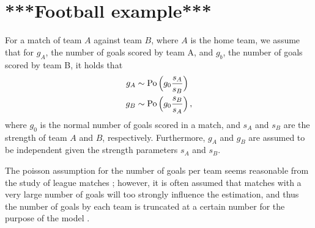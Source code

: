 \section{***Football example***}

For a match of team $A$ against team $B$, where $A$ is the home team,
we assume that for $g_A$, the number of goals scored by team A,
and $g_b$, the number of goals scored by team B, it holds that
\begin{align*}
g_A &\sim \operatorname{Po}\Big(g_0 \frac{s_A}{s_B}\Big) \\
g_B &\sim \operatorname{Po}\Big(g_0 \frac{s_B}{s_A}\Big) \,,
\end{align*}
where $g_0$ is the normal number of goals scored in a match,
and $s_A$ and $s_B$ are the strength of team $A$ and $B$, respectively.
Furthermore, $g_A$ and $g_B$ are assumed to be independent given the strength parameters $s_A$ and $s_B$.

The poisson assumption for the number of goals per team seems reasonable
from the study of league matches \parencite[see, e.g.,][p.~401 and Fig.~1]{2000:rue};
however, it is often assumed that matches with a very large number of goals
will too strongly influence the estimation,
and thus the number of goals by each team is truncated at a certain number
for the purpose of the model \parencite[e.g., 5, see][p.~402]{2000:rue}.
